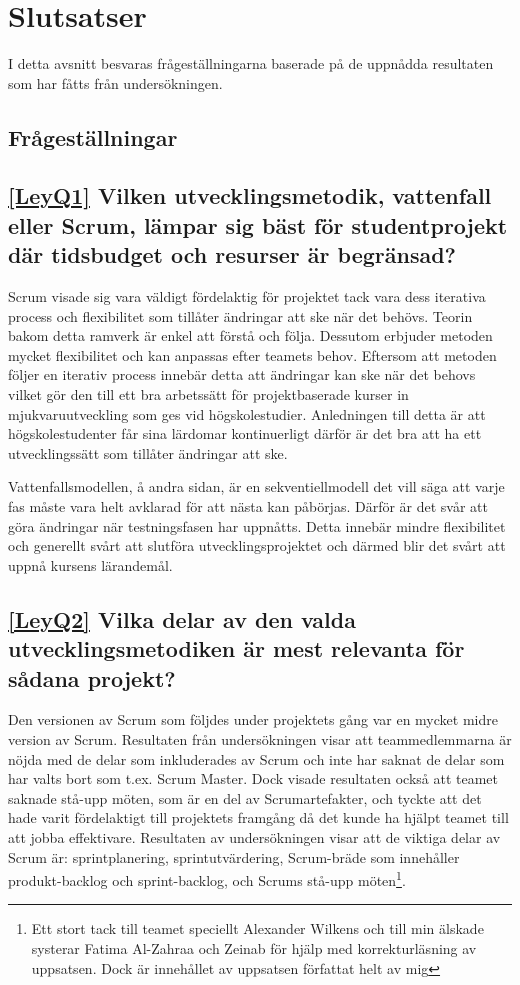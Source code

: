 
\section{Slutsatser}
\label{sec:Lieth_Wahid-conclusion}
I detta avsnitt besvaras frågeställningarna baserade på de uppnådda resultaten som har fåtts från undersökningen.
\subsection{Frågeställningar}

\subsection*{\ref{LeyQ1} Vilken utvecklingsmetodik, vattenfall eller Scrum, lämpar sig bäst för studentprojekt där tidsbudget och resurser är begränsad?}
Scrum visade sig vara väldigt fördelaktig för projektet tack vara dess iterativa process och flexibilitet som tillåter ändringar att ske när det behövs. Teorin bakom detta ramverk är enkel att förstå och följa. Dessutom erbjuder metoden mycket flexibilitet och kan anpassas efter teamets behov. Eftersom att metoden följer en iterativ process innebär detta att ändringar kan ske när det behovs vilket gör den till ett bra arbetssätt för projektbaserade kurser in mjukvaruutveckling som ges vid högskolestudier. Anledningen till detta är att högskolestudenter får sina lärdomar kontinuerligt därför är det bra att ha ett utvecklingssätt som tillåter ändringar att ske.
	
Vattenfallsmodellen, å andra sidan, är en sekventiellmodell det vill säga att varje fas måste vara helt avklarad för att nästa kan påbörjas. Därför är det svår att göra ändringar när testningsfasen har uppnåtts. Detta innebär mindre flexibilitet och generellt svårt att slutföra utvecklingsprojektet och därmed blir det svårt att uppnå kursens lärandemål.
		
\subsection*{\ref{LeyQ2} Vilka delar av den valda utvecklingsmetodiken är mest relevanta för sådana projekt? }
Den versionen av Scrum som följdes under projektets gång var en mycket midre version av Scrum. Resultaten från undersökningen visar att teammedlemmarna är nöjda med de delar som inkluderades av Scrum och inte har saknat de delar som har valts bort som t.ex. Scrum Master. Dock visade resultaten också att teamet saknade stå-upp möten, som är en del av Scrumartefakter, och tyckte att det hade varit fördelaktigt till projektets framgång då det kunde ha hjälpt teamet till att jobba effektivare. Resultaten av undersökningen visar att de viktiga delar av Scrum är: sprintplanering, sprintutvärdering, Scrum-bräde som innehåller produkt-backlog och sprint-backlog, och Scrums stå-upp möten\footnote{Ett stort tack till teamet speciellt Alexander Wilkens och till min älskade systerar Fatima Al-Zahraa och Zeinab för hjälp med korrekturläsning av uppsatsen. Dock är innehållet av uppsatsen författat helt av mig}.